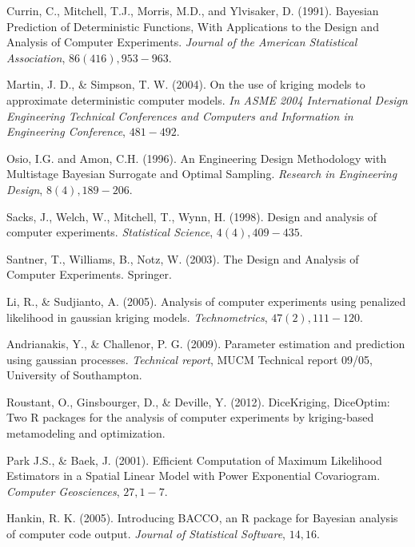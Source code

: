 \documentclass[12pt,titlepage]{report}
\theoremstyle{definition}
\theoremstyle{remark}
\begin{document}
\begin{thebibliography}{94}


 Currin, C., Mitchell, T.J., Morris, M.D., and Ylvisaker, D. (1991). Bayesian Prediction of Deterministic Functions, With Applications to the Design and Analysis of Computer Experiments. {\it Journal of the American Statistical Association}, $86(416), 953-963$. 

 Martin, J. D., \& Simpson, T. W. (2004). On the use of kriging models to approximate deterministic computer models. {\it In ASME 2004 International Design Engineering Technical Conferences and Computers and Information in Engineering Conference}, $481-492$.

 Osio, I.G. and Amon, C.H. (1996). An Engineering Design Methodology with Multistage Bayesian Surrogate and Optimal Sampling. {\it Research in Engineering Design}, $8(4), 189-206$.

 Sacks, J., Welch, W., Mitchell, T., Wynn, H. (1998). Design and analysis of computer experiments. {\it Statistical Science}, $4(4), 409-435$.

 Santner, T., Williams, B., Notz, W. (2003). The Design and Analysis of Computer Experiments. Springer.

 Li, R., \& Sudjianto, A. (2005). Analysis of computer experiments using penalized likelihood in gaussian kriging models. {\it Technometrics}, $47(2), 111-120$.

 Andrianakis, Y., \& Challenor, P. G. (2009). Parameter estimation and prediction using gaussian processes. {\it Technical report}, MUCM Technical report 09/05, University of Southampton.

 Roustant, O., Ginsbourger, D., \& Deville, Y. (2012). DiceKriging, DiceOptim: Two R packages for the analysis of computer experiments by kriging-based metamodeling and optimization.

 Park J.S., \& Baek, J. (2001). Efficient Computation of Maximum Likelihood Estimators in a
Spatial Linear Model with Power Exponential Covariogram. {\it Computer Geosciences}, $27, 1-7$.

 Hankin, R. K. (2005). Introducing BACCO, an R package for Bayesian analysis of computer code output. {\it Journal of Statistical Software}, $14, 16$.


\end{thebibliography}
\end{document}
